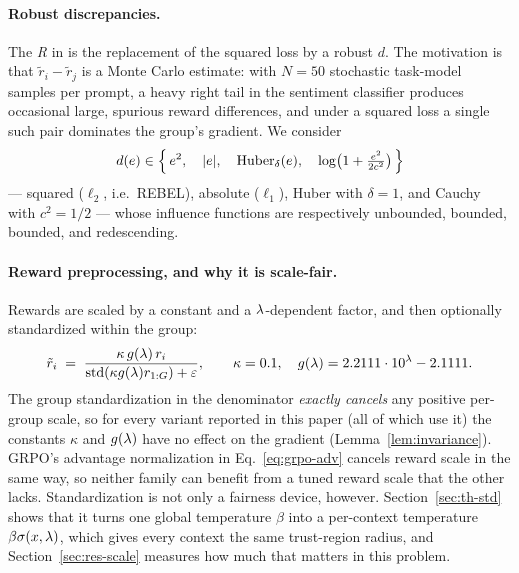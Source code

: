 \paragraph{Robust discrepancies.}
The \emph{R} in \rrebel{} is the replacement of the squared loss by a robust
$d$. The motivation is that $\tilde{r}_i - \tilde{r}_j$ is a Monte Carlo
estimate: with $N=50$ stochastic task-model samples per prompt, a heavy right
tail in the sentiment classifier produces occasional large, spurious reward
differences, and under a squared loss a single such pair dominates the group's
gradient. We consider
\begin{equation}
  d(e) \in \Bigl\{\, e^2,\quad |e|,\quad
    \mathrm{Huber}_\delta(e),\quad
    \log\bigl(1 + \tfrac{e^2}{2c^2}\bigr) \,\Bigr\}
\end{equation}
--- squared ($\ell_2$, i.e.\ REBEL), absolute ($\ell_1$),
Huber with $\delta = 1$, and Cauchy with $c^2 = 1/2$ --- whose influence
functions are respectively unbounded, bounded, bounded, and redescending.

\paragraph{Reward preprocessing, and why it is scale-fair.}
Rewards are scaled by a constant and a $\lambda$-dependent factor, and then
optionally standardized within the group:
\begin{equation}
  \tilde{r}_i \;=\; \frac{\kappa\, g(\lambda)\, r_i}
                         {\mathrm{std}(\kappa g(\lambda) r_{1:G}) + \varepsilon},
  \qquad \kappa = 0.1, \quad g(\lambda) = 2.2111 \cdot 10^{\lambda} - 2.1111 .
  \label{eq:rewardprep}
\end{equation}
The group standardization in the denominator \emph{exactly cancels} any positive
per-group scale, so for every \rrebel{} variant reported in this paper (all of
which use it) the constants $\kappa$ and $g(\lambda)$ have no effect on the
gradient (Lemma~\ref{lem:invariance}). GRPO's advantage normalization in
Eq.~\eqref{eq:grpo-adv} cancels reward scale in the same way, so neither family
can benefit from a tuned reward scale that the other lacks. Standardization is
not only a fairness device, however. Section~\ref{sec:th-std} shows that it
turns one global temperature $\beta$ into a per-context temperature
$\beta\sigma(x,\lambda)$, which gives every context the same trust-region radius,
and Section~\ref{sec:res-scale} measures how much that matters in this problem.

